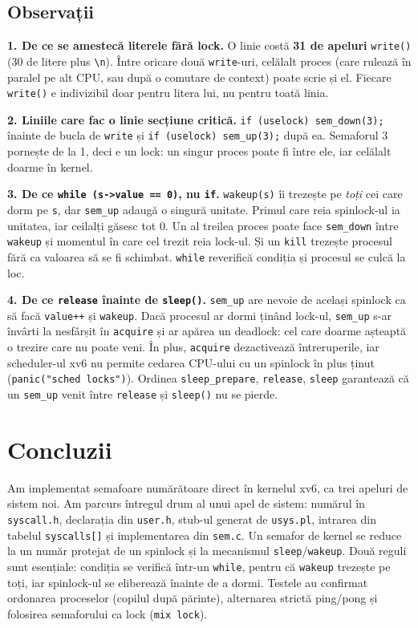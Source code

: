 \documentclass[11pt,a4paper]{article}
\begin{document}
\subsection*{Observații}
\begin{answer}
\textbf{1. De ce se amestecă literele fără lock.} O linie costă \textbf{31 de apeluri} \texttt{write()} (30 de litere plus
\texttt{\textbackslash n}). Între oricare două \texttt{write}-uri, celălalt proces (care rulează în paralel pe alt CPU,
sau după o comutare de context) poate scrie și el. Fiecare \texttt{write()} e indivizibil doar pentru litera lui, nu pentru
toată linia.

\medskip
\textbf{2. Liniile care fac o linie secțiune critică.} \texttt{if (uselock) sem\_down(3);} înainte de bucla de
\texttt{write} și \texttt{if (uselock) sem\_up(3);} după ea. Semaforul 3 pornește de la 1, deci e un lock: un singur proces
poate fi între ele, iar celălalt doarme în kernel.

\medskip
\textbf{3. De ce \texttt{while (s->value == 0)}, nu \texttt{if}.} \texttt{wakeup(s)} îi trezește pe \emph{toți} cei care
dorm pe \texttt{s}, dar \texttt{sem\_up} adaugă o singură unitate. Primul care reia spinlock-ul ia unitatea, iar ceilalți
găsesc tot 0. Un al treilea proces poate face \texttt{sem\_down} între \texttt{wakeup} și momentul în care cel trezit reia
lock-ul. Și un \texttt{kill} trezește procesul fără ca valoarea să se fi schimbat. \texttt{while} reverifică condiția și
procesul se culcă la loc.

\medskip
\textbf{4. De ce \texttt{release} înainte de \texttt{sleep()}.} \texttt{sem\_up} are nevoie de același spinlock ca să
facă \texttt{value++} și \texttt{wakeup}. Dacă procesul ar dormi ținând lock-ul, \texttt{sem\_up} s-ar învârti la
nesfârșit în \texttt{acquire} și ar apărea un deadlock: cel care doarme așteaptă o trezire care nu poate veni. În plus,
\texttt{acquire} dezactivează întreruperile, iar scheduler-ul xv6 nu permite cedarea CPU-ului cu un spinlock în plus ținut
(\texttt{panic("sched locks")}). Ordinea \texttt{sleep\_prepare}, \texttt{release}, \texttt{sleep} garantează că un
\texttt{sem\_up} venit între \texttt{release} și \texttt{sleep()} nu se pierde.
\end{answer}

\section*{Concluzii}
Am implementat semafoare numărătoare direct în kernelul xv6, ca trei apeluri de sistem noi. Am parcurs întregul drum al
unui apel de sistem: numărul în \texttt{syscall.h}, declarația din \texttt{user.h}, stub-ul generat de \texttt{usys.pl},
intrarea din tabelul \texttt{syscalls[]} și implementarea din \texttt{sem.c}. Un semafor de kernel se reduce la un
număr protejat de un spinlock și la mecanismul \texttt{sleep}/\texttt{wakeup}. Două reguli sunt esențiale: condiția se
verifică într-un \texttt{while}, pentru că \texttt{wakeup} trezește pe toți, iar spinlock-ul se eliberează înainte de a
dormi. Testele au confirmat ordonarea proceselor (copilul după părinte), alternarea strictă ping/pong și folosirea
semaforului ca lock (\texttt{mix lock}).
\end{document}

